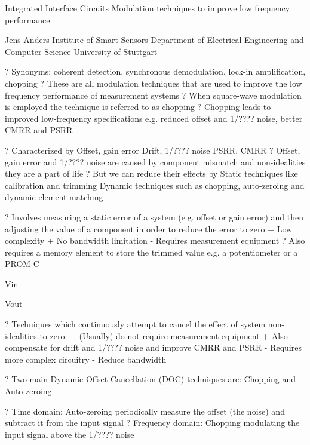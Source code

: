 \documentclass[2pt,landscape]{article}
\begin{document}
\begin{multicols*}{5}
Integrated Interface Circuits \textbullet 
Modulation techniques to improve 
low frequency performance

Jens Anders 
Institute of Smart Sensors
Department of Electrical Engineering and Computer 
Science
University of Stuttgart



?	Synonyms: coherent detection, synchronous demodulation, lock-in 
amplification, chopping
?	These are all modulation techniques that are used to improve the low 
frequency performance of measurement systems
?	When square-wave modulation is employed the technique is referred 
to as chopping
?	Chopping leads to improved low-frequency specifications e.g. 
reduced offset and 1/???? noise, better CMRR and PSRR



?	Characterized by
\textbullet 	Offset, gain error
\textbullet 	Drift, 1/???? noise
\textbullet 	PSRR, CMRR
?	Offset, gain error and 
1/???? noise are caused  
by component mismatch 
and non-idealities
they are a part of life
?	But we can reduce their effects by
\textbullet 	Static techniques like calibration and trimming
\textbullet 	Dynamic techniques such as chopping, auto-zeroing 
and dynamic element matching



?	Involves measuring a static error of a system
(e.g. offset or gain error) and then adjusting the value of a component 
in order to reduce the error to zero
+ Low complexity
+ No bandwidth limitation
- Requires measurement equipment
?	Also requires a memory element 
to store the trimmed value
e.g. a potentiometer or a PROM
C






Vin



Vout



?	Techniques which continuously attempt to cancel the effect of
system non-idealities to zero.
+ (Usually) do not require measurement equipment
+  Also compensate for drift and 1/???? noise and improve 
CMRR and PSRR
-	Requires more complex circuitry
-	Reduce bandwidth


?	Two main Dynamic Offset Cancellation (DOC) techniques are:
Chopping and Auto-zeroing



?	Time domain: Auto-zeroing
periodically measure the offset (the noise) and subtract it from the 
input signal
?	Frequency domain: Chopping
modulating the input signal above the 1/???? noise




\end{multicols*}
\end{document}
